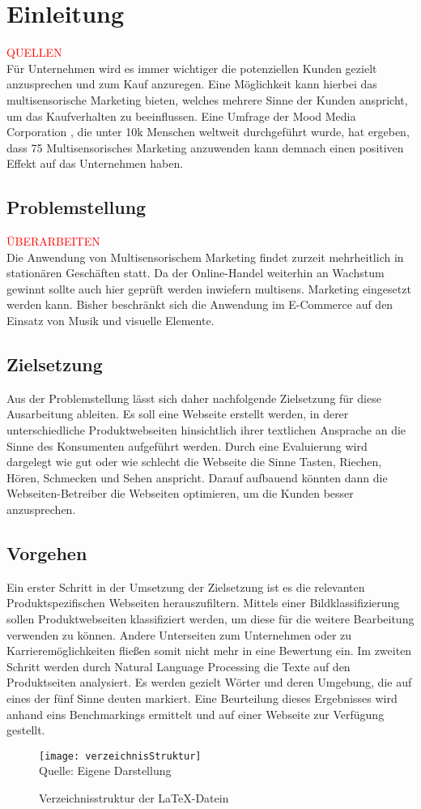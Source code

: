 \section{Einleitung}  \textcolor{red}{QUELLEN} \\
Für Unternehmen wird es immer wichtiger die potenziellen Kunden gezielt anzusprechen und zum Kauf anzuregen. Eine Möglichkeit kann hierbei das multisensorische Marketing bieten, welches mehrere Sinne der Kunden anspricht, um das Kaufverhalten zu beeinflussen. Eine Umfrage der Mood Media Corporation , die unter 10k Menschen weltweit durchgeführt wurde, hat ergeben, dass 75%
Multisensorisches Marketing anzuwenden kann demnach einen positiven Effekt auf das Unternehmen haben.

\subsection{Problemstellung}
\textcolor{red}{ÜBERARBEITEN} \\
Die Anwendung von Multisensorischem Marketing findet zurzeit mehrheitlich in stationären Geschäften statt. Da der Online-Handel weiterhin an Wachstum gewinnt   sollte auch hier geprüft werden inwiefern multisens. Marketing eingesetzt werden kann.
Bisher beschränkt sich die Anwendung im E-Commerce auf den Einsatz von Musik und visuelle Elemente.

\subsection{Zielsetzung}
Aus der Problemstellung lässt sich daher nachfolgende Zielsetzung für diese Ausarbeitung ableiten. Es soll eine Webseite erstellt werden, in derer unterschiedliche Produktwebseiten hinsichtlich ihrer textlichen Ansprache an die Sinne des Konsumenten aufgeführt werden. Durch eine Evaluierung wird dargelegt wie gut oder wie schlecht die Webseite die Sinne Tasten, Riechen, Hören, Schmecken und Sehen anspricht.
Darauf aufbauend könnten dann die Webseiten-Betreiber die Webseiten optimieren, um die Kunden besser anzusprechen.

\subsection{Vorgehen}
Ein erster Schritt in der Umsetzung der Zielsetzung ist es die relevanten Produktspezifischen Webseiten herauszufiltern. Mittels einer Bildklassifizierung sollen Produktwebseiten klassifiziert werden, um diese für die weitere Bearbeitung verwenden zu können. Andere Unterseiten zum Unternehmen oder zu Karrieremöglichkeiten fließen somit nicht mehr in eine Bewertung ein. Im zweiten Schritt werden durch Natural Language Processing die Texte auf den Produktseiten analysiert. Es werden gezielt Wörter und deren Umgebung, die auf eines der fünf Sinne deuten markiert.
Eine Beurteilung dieses Ergebnisses wird anhand eins Benchmarkings ermittelt und auf einer Webseite zur Verfügung gestellt.

\begin{figure}[H]
\caption{Verzeichnisstruktur der \LaTeX{}-Datein}\label{fig:verzeichnisStruktur}
\texttt{[image: verzeichnisStruktur]}
\\
Quelle: Eigene Darstellung
\end{figure}
